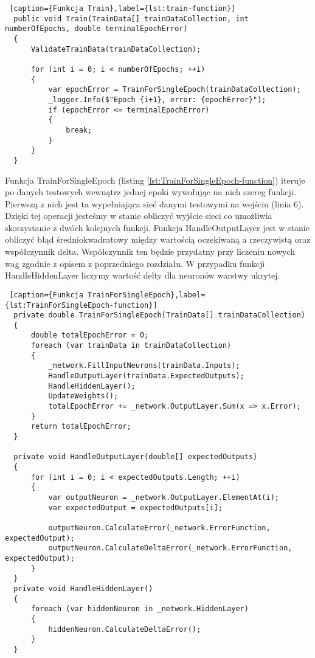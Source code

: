 \begin{lstlisting} [caption={Funkcja Train},label={lst:train-function}]
  public void Train(TrainData[] trainDataCollection, int numberOfEpochs, double terminalEpochError)
  {
      ValidateTrainData(trainDataCollection);

      for (int i = 0; i < numberOfEpochs; ++i)
      {
          var epochError = TrainForSingleEpoch(trainDataCollection);
          _logger.Info($"Epoch {i+1}, error: {epochError}");
          if (epochError <= terminalEpochError)
          {
              break;
          }
      }
  }
\end{lstlisting}

Funkcja TrainForSingleEpoch (listing \ref{lst:TrainForSingleEpoch-function}) iteruje po danych testowych wewnątrz jednej epoki wywołując na nich szereg funkcji.
Pierwszą z nich jest ta wypełniająca sieć danymi testowymi na wejściu (linia 6). Dzięki tej operacji jesteśmy w stanie obliczyć wyjście sieci co umożliwia skorzystanie z dwóch kolejnych funkcji.
Funkcja HandleOutputLayer jest w stanie obliczyć błąd średniokwadratowy między wartością oczekiwaną a rzeczywistą oraz współczynnik delta.
Współczynnik ten będzie przydatny przy liczeniu nowych wag zgodnie z opisem z poprzedniego rozdziału.
W przypadku funkcji HandleHiddenLayer liczymy wartość delty dla neuronów warstwy ukrytej.


\begin{lstlisting} [caption={Funkcja TrainForSingleEpoch},label={lst:TrainForSingleEpoch-function}]
  private double TrainForSingleEpoch(TrainData[] trainDataCollection)
  {
      double totalEpochError = 0;
      foreach (var trainData in trainDataCollection)
      {
          _network.FillInputNeurons(trainData.Inputs);
          HandleOutputLayer(trainData.ExpectedOutputs);
          HandleHiddenLayer();
          UpdateWeights();
          totalEpochError += _network.OutputLayer.Sum(x => x.Error);
      }
      return totalEpochError;
  }

  private void HandleOutputLayer(double[] expectedOutputs)
  {
      for (int i = 0; i < expectedOutputs.Length; ++i)
      {
          var outputNeuron = _network.OutputLayer.ElementAt(i);
          var expectedOutput = expectedOutputs[i];

          outputNeuron.CalculateError(_network.ErrorFunction, expectedOutput);
          outputNeuron.CalculateDeltaError(_network.ErrorFunction, expectedOutput);
      }
  }
  private void HandleHiddenLayer()
  {
      foreach (var hiddenNeuron in _network.HiddenLayer)
      {
          hiddenNeuron.CalculateDeltaError();
      }
  }

\end{lstlisting}

